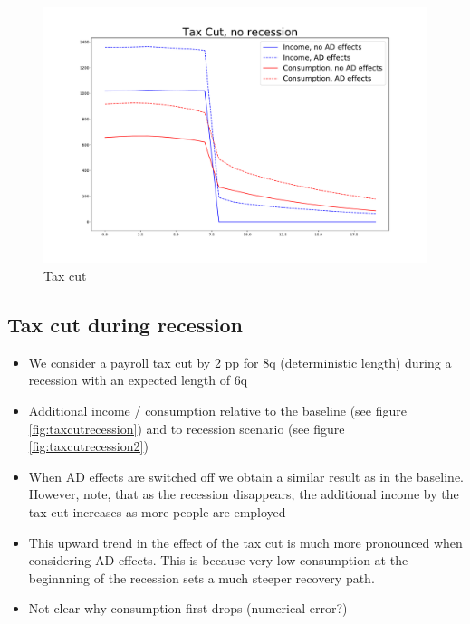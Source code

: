 \documentclass[]{article}
\begin{document}
\begin{figure} 
	\begin{centering}
		\includegraphics[width=\linewidth]{../tax_cut.pdf}
		\caption{Tax cut}
		\label{fig:taxcut}
	\end{centering}
\end{figure}

\FloatBarrier
\subsection{Tax cut during recession}

\begin{itemize}
	\item We consider a payroll tax cut by 2 pp for 8q (deterministic length) during a recession with an expected length of 6q 
	\item Additional income / consumption relative to the baseline (see figure \ref{fig:taxcutrecession}) and to recession scenario (see figure \ref{fig:taxcutrecession2})
	\item When AD effects are switched off we obtain a similar result as in the baseline. However, note, that as the recession disappears, the additional income by the tax cut increases as more people are employed
	\item This upward trend in the effect of the tax cut is much more pronounced when considering AD effects. This is because very low consumption at the beginnning of the recession sets a much steeper recovery path.
	\item Not clear why consumption first drops (numerical error?)
\end{itemize}
\end{document}
